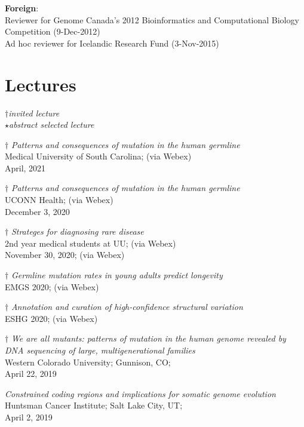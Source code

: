 \documentclass[margin,line]{cv}
\begin{document}
\begin{resume}
    \textbf{Foreign}:\\
    Reviewer for Genome Canada's 2012 Bioinformatics and Computational Biology Competition (9-Dec-2012)\\
    Ad hoc reviewer for Icelandic Research Fund (3-Nov-2015)



    \section{\mysidestyle Lectures}

    $\dagger$\textit{invited lecture}\\
    $\star$\textit{abstract selected lecture}

    $\dagger$ \textit{Patterns and consequences of mutation in the human germline} \\
    Medical University of South Carolina; (via Webex) \\
    April, 2021

    $\dagger$ \textit{Patterns and consequences of mutation in the human germline} \\
    UCONN Health; (via Webex) \\
    December 3, 2020

    $\dagger$ \textit{Strateges for diagnosing rare disease} \\
    2nd year medical students at UU; (via Webex) \\
    November 30, 2020; (via Webex)

    $\dagger$ \textit{Germline mutation rates in young adults predict longevity} \\
    EMGS 2020; (via Webex) 

    $\dagger$ \textit{Annotation and curation of high-confidence structural variation} \\
    ESHG 2020; (via Webex)

    $\dagger$ \textit{We are all mutants: patterns of mutation in the
human genome revealed by DNA sequencing of large, multigenerational families
} \\
    Western Colorado University; Gunnison, CO; \\
    April 22, 2019

    \textit{Constrained coding regions and implications for somatic genome evolution} \\
    Huntsman Cancer Institute; Salt Lake City, UT; \\
    April 2, 2019


\end{resume}
\end{document}
